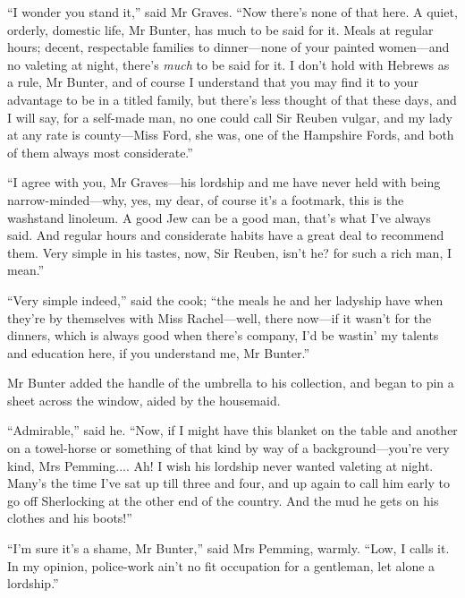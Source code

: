 \enquote{I wonder you stand it,} said Mr Graves. \enquote{Now there’s none of that here. A quiet, orderly, domestic life, Mr Bunter, has much to be said for it. Meals at regular hours; decent, respectable families to dinner\allowbreak---\allowbreak none of your painted women\allowbreak---\allowbreak and no valeting at night, there’s \textit{much} to be said for it. I don’t hold with Hebrews as a rule, Mr Bunter, and of course I understand that you may find it to your advantage to be in a titled family, but there’s less thought of that these days, and I will say, for a self-made man, no one could call Sir Reuben vulgar, and my lady at any rate is county\allowbreak---\allowbreak Miss Ford, she was, one of the Hampshire Fords, and both of them always most considerate.}

\enquote{I agree with you, Mr Graves\allowbreak---\allowbreak his lordship and me have never held with being narrow-minded\allowbreak---\allowbreak why, yes, my dear, of course it’s a footmark, this is the washstand linoleum. A good Jew can be a good man, that’s what I’ve always said. And regular hours and considerate habits have a great deal to recommend them. Very simple in his tastes, now, Sir Reuben, isn’t he? for such a rich man, I mean.}

\enquote{Very simple indeed,} said the cook; \enquote{the meals he and her ladyship have when they’re by themselves with Miss Rachel\allowbreak---\allowbreak well, there now\allowbreak---\allowbreak if it wasn’t for the dinners, which is always good when there’s company, I’d be wastin’ my talents and education here, if you understand me, Mr Bunter.}

Mr Bunter added the handle of the umbrella to his collection, and began to pin a sheet across the window, aided by the housemaid.

\enquote{Admirable,} said he. \enquote{Now, if I might have this blanket on the table and another on a towel-horse or something of that kind by way of a background\allowbreak---\allowbreak you’re very kind, Mrs Pemming.... Ah! I wish his lordship never wanted valeting at night. Many’s the time I’ve sat up till three and four, and up again to call him early to go off Sherlocking at the other end of the country. And the mud he gets on his clothes and his boots!}

\enquote{I’m sure it’s a shame, Mr Bunter,} said Mrs Pemming, warmly. \enquote{Low, I calls it. In my opinion, police-work ain’t no fit occupation for a gentleman, let alone a lordship.}

